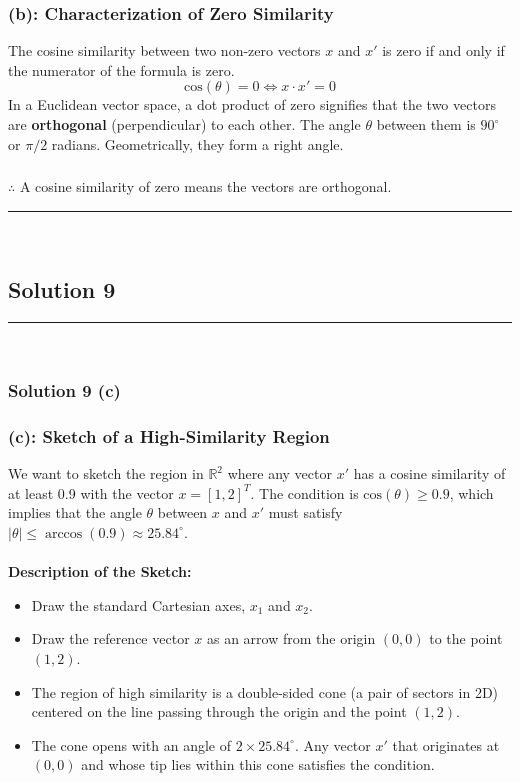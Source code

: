 \documentclass{article}
\begin{document}
\subsubsection*{(b): Characterization of Zero Similarity}
\parbox{\textwidth}{
The cosine similarity between two non-zero vectors $x$ and $x'$ is zero if and only if the numerator of the formula is zero.
$$ \text{cos}(\theta) = 0 \iff x \cdot x' = 0 $$
In a Euclidean vector space, a dot product of zero signifies that the two vectors are \textbf{orthogonal} (perpendicular) to each other. The angle $\theta$ between them is $90^\circ$ or $\pi/2$ radians. Geometrically, they form a right angle.
}
\subsubsection*{\normalfont}{$\therefore$ A cosine similarity of zero means the vectors are orthogonal.}

\noindent\rule{\textwidth}{0.4pt}\\

\newpage

\subsection*{Solution 9}
\noindent\rule{\textwidth}{0.4pt}\\
\subsubsection*{Solution 9 (c)}


\subsubsection*{(c): Sketch of a High-Similarity Region}
\parbox{\textwidth}{
We want to sketch the region in $\mathbb{R}^2$ where any vector $x'$ has a cosine similarity of at least 0.9 with the vector $x = [1, 2]^T$. The condition is $\text{cos}(\theta) \ge 0.9$, which implies that the angle $\theta$ between $x$ and $x'$ must satisfy $|\theta| \le \arccos(0.9) \approx 25.84^\circ$.
\\~\\
\textbf{Description of the Sketch:}
\begin{itemize}
    \item Draw the standard Cartesian axes, $x_1$ and $x_2$.
    \item Draw the reference vector $x$ as an arrow from the origin $(0,0)$ to the point $(1,2)$.
    \item The region of high similarity is a double-sided cone (a pair of sectors in 2D) centered on the line passing through the origin and the point $(1,2)$.
    \item The cone opens with an angle of $2 \times 25.84^\circ$. Any vector $x'$ that originates at $(0,0)$ and whose tip lies within this cone satisfies the condition.
\end{itemize}
}
\end{document}
